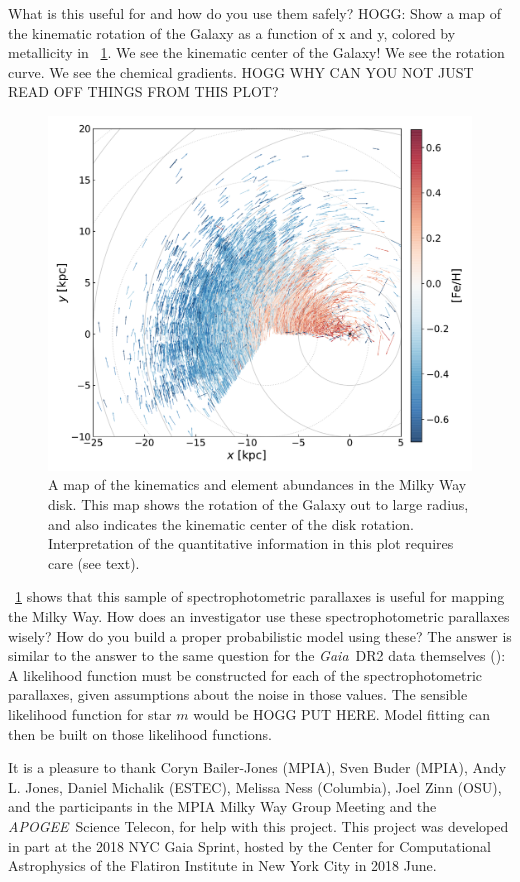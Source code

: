 \documentclass[modern]{aastex62}
\newcommand{\acronym}[1]{{\small{#1}}}
\newcommand{\project}[1]{\textsl{#1}}
\newcommand{\apogee}{\project{\acronym{APOGEE}}}
\newcommand{\gaia}{\project{Gaia}}
\begin{document}
What is this useful for and how do you use them safely?
HOGG: Show a map of the kinematic rotation of the Galaxy as a function of
x and y, colored by metallicity in \figurename~\ref{fig:disk}.
We see the kinematic center of the Galaxy! We see the rotation curve.
We see the chemical gradients. HOGG WHY CAN YOU NOT JUST READ OFF THINGS FROM THIS PLOT?
\begin{figure}
\includegraphics[width=\textwidth]{map.pdf}
\caption{A map of the kinematics and element abundances in the Milky Way disk.
  This map shows the rotation of the Galaxy out to large radius, and also
  indicates the kinematic center of the disk rotation. Interpretation of
  the quantitative information in this plot requires care (see text).\label{fig:disk}}
\end{figure}

\figurename~\ref{fig:disk} shows that this sample of spectrophotometric parallaxes is useful for
mapping the Milky Way.
How does an investigator use these spectrophotometric parallaxes wisely?
How do you build a proper probabilistic model using these?
The answer is similar to the answer to the same question for the \gaia\ \acronym{DR2} data
themselves (\citealt{gaialf}): A likelihood function must be constructed for each of the
spectrophotometric parallaxes, given assumptions about the noise in those values.
The sensible likelihood function for star $m$ would be HOGG PUT HERE.
Model fitting can then be built on those likelihood functions.

\acknowledgements
It is a pleasure to thank
  Coryn Bailer-Jones (\acronym{MPIA}),
  Sven Buder (\acronym{MPIA}),
  Andy L. Jones,
  Daniel Michalik (\acronym{ESTEC}),
  Melissa Ness (Columbia),
  Joel Zinn (OSU),
  and the participants in the \acronym{MPIA} Milky Way Group Meeting
  and the \apogee\ Science Telecon,
for help with this project.
This project was developed in part at the
2018 \acronym{NYC} Gaia Sprint, hosted by the Center for Computational Astrophysics of
the Flatiron Institute in New York City in 2018 June.
\end{document}
